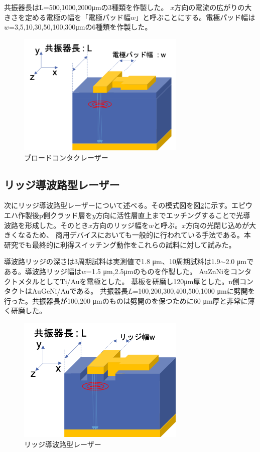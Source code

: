 共振器長はL=500,1000,2000\si{ \micro\metre}の3種類を作製した。
$x$方向の電流の広がりの大きさを定める電極の幅を「電極パッド幅$w$」と呼ぶことにする。電極パッド幅は$w$=3,5,10,30,50,100,300\si{ \micro\metre}の6種類を作製した。

\begin{figure}[h]
	\centering
	\includegraphics[width=8cm]{figure/fig_2_1_broadcontact.png}
	\caption{ブロードコンタクレーザー}
	\label{fig:sample_broadcontact}
\end{figure}

\subsection{リッジ導波路型レーザー}%
次にリッジ導波路型レーザーについて述べる。その模式図を図\ref{fig_2_1_ridge}に示す。エピウエハ作製後p側クラッド層を$y$方向に活性層直上までエッチングすることで光導波路を形成した。そのとき$x$方向のリッジ幅を$w$と呼ぶ。$x$方向の光閉じ込めが大きくなるため、%
商用デバイスにおいても一般的に行われている手法である。本研究でも最終的に利得スイッチング動作をこれらの試料に対して試みた。

導波路リッジの深さは3周期試料は実測値で1.8 \si{\micro\metre}、10周期試料は1.9$\sim$2.0 \si{\micro\metre}である。導波路リッジ幅は$w$=1.5 \si{\micro\metre},2.5\si{\micro\metre}のものを作製した。
AuZnNiをコンタクトメタルとしてTi/Auを電極とした。
基板を研磨し120\si{ \micro\metre}厚とした。n側コンタクトはAuGeNi/Auである。
共振器長$L$=100,200,300,400,500,1000 \si{ \micro\metre}に劈開を行った。共振器長が100,200  \si{ \micro\metre}のものは劈開のを保つために60 \si{ \micro\metre}厚と非常に薄く研磨した。
\begin{figure}[h]
	\centering
	\includegraphics[width=8cm]{figure/fig_2_1_ridge.png}
	\caption{リッジ導波路型レーザー}
	\label{fig_2_1_ridge}
\end{figure}

